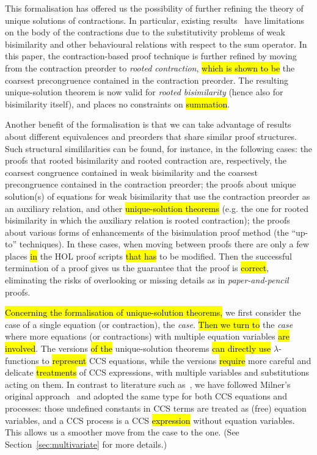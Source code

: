 This formalisation has offered us the possibility of
further refining the theory of unique solutions of contractions.
In particular,  existing results~\cite{sangiorgi2017equations} have
limitations on the body of the contractions due to the
substitutivity problems of weak bisimilarity and other behavioural relations with respect
to the sum operator.
In this paper, the contraction-based proof technique is further
refined by moving from the contraction preorder to
\emph{rooted contraction}, \hl{which is shown to be} the coarsest
precongruence contained in the contraction preorder.
The resulting unique-solution theorem is now valid for
\emph{rooted bisimilarity} (hence also for bisimilarity itself), and places no 
constraints on \hl{summation}.

Another benefit of the formalisation is 
that we can take advantage of results about different 
equivalences and preorders that share similar proof structures.
Such structural simililarities can be found, for instance, in the
following cases: the proofs that rooted bisimilarity and rooted
contraction are, respectively, the coarsest congruence contained in
weak bisimilarity and the coarsest precongruence contained in the
contraction preorder; the proofs about unique solution(s) of equations
for weak bisimilarity that use the contraction preorder as an
auxiliary relation, and other \hl{unique-solution theorems} (e.g. the one
for rooted bisimilarity 
 in which the auxiliary relation is rooted contraction); the
proofs about various forms of enhancements of the bisimulation proof
method (the ``up-to'' techniques).
%
In these cases, when moving between proofs there are only a few places \hl{in}
the HOL proof scripts \hl{that has} to be modified.
Then the successful termination of a proof gives us the
 guarantee that the proof is \hl{correct}, eliminating the risks 
of overlooking or missing details as in \emph{paper-and-pencil} proofs.

\hl{Concerning the formalisation of unique-solution theorems,}
we first consider the case of a single equation (or contraction), the
\emph{\univariate case}.
\hl{Then we turn to} the \emph{\multivariate case} where more equations
  (or contractions) with multiple equation variables \hl{are involved}.
  The \univariate versions \hl{of the} unique-solution theorems
  \hl{can directly use}
$\lambda$-functions to \hl{represent} CCS equations,
while the \multivariate versions \hl{require}
more careful and delicate \hl{treatments} of CCS
expressions, with multiple variables and substitutions acting on them.
In contrast to literature such as~\cite{Gorrieri:2015jt},
we have followed Milner's original approach~\cite{milner1990operational} and adopted the same
type for both CCS equations and processes: those undefined constants
in CCS terms are treated as  (free) equation variables, and a CCS
process is a CCS \hl{expression} without equation variables.  %
This allows us a smoother move from the \univariate case to the \multivariate
one. (See Section~\ref{sec:multivariate} for more details.)

